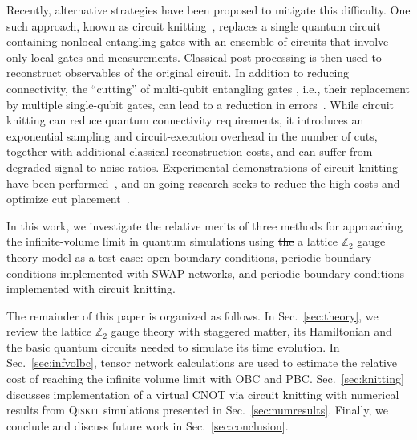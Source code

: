 \documentclass[twocolumn,superscriptaddress,showpacs,nofootinbib,notitlepage,preprintnumbers,secnumarabic,amssymb, floatfix, nobibnotes, aps, prd]{revtex4-2}
\begin{document}
Recently, alternative strategies have been proposed to mitigate this difficulty. 
One such approach, known as circuit knitting~\cite{PhysRevLett.125.150504,Mitarai:2019vae,Piveteau:2021jup,Mitarai:2021sud}, replaces a single quantum circuit containing nonlocal entangling gates with an ensemble of circuits that involve only local gates and measurements. 
Classical post-processing is then used to reconstruct observables of the original circuit. 
In addition to reducing connectivity, the ``cutting'' of multi-qubit entangling gates , i.e., their replacement by multiple single-qubit gates, can lead to a reduction in errors~\cite{Yamamoto:2022yfd}. 
While circuit knitting can reduce quantum connectivity requirements, it introduces an exponential sampling and circuit-execution overhead in the number of cuts, together with additional classical reconstruction costs, and can suffer from degraded signal-to-noise ratios. 
Experimental demonstrations of circuit knitting have been performed~\cite{Singh:2023uhr}, and on-going research seeks to reduce the high costs and optimize cut placement~\cite{Perlin:2021,Chen:2022mgb,Lowe2023fastquantumcircuit,Lian:2023,Yang:2024jvu,10.1145/3579371.3589352,Piveteau:2025pso,Idan:2026cutting}.

In this work, we investigate the relative merits of three methods for approaching the infinite-volume limit in quantum simulations using {\color{red}\st{the} a} lattice $\mathbb{Z}_2$ gauge theory model as a test case: open boundary conditions, periodic boundary conditions implemented with SWAP networks, and periodic boundary conditions implemented with circuit knitting.

The remainder of this paper is organized as follows. 
In Sec.~\ref{sec:theory}, we review the lattice $\mathbb{Z}_2$ gauge theory with staggered matter, its Hamiltonian and the basic quantum circuits needed to simulate its time evolution.  
In Sec.~\ref{sec:infvolbc}, tensor network calculations are used to estimate the relative cost of reaching the infinite volume limit with OBC and PBC.  
Sec.~\ref{sec:knitting} discusses implementation of a virtual CNOT via circuit knitting with numerical results from \textsc{Qiskit} simulations presented in Sec.~\ref{sec:numresults}.  
Finally, we conclude and discuss future work in Sec.~\ref{sec:conclusion}.
\end{document}
